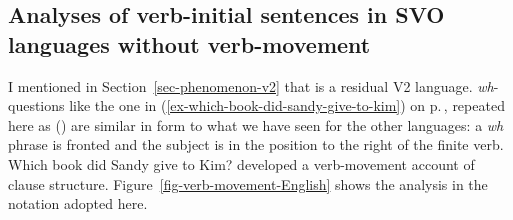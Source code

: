 


\subsection{Analyses of verb-initial sentences in SVO languages without verb-movement}
\label{sec-aux-flat}

I mentioned in Section~\ref{sec-phenomenon-v2} that  is a residual V2
language. \emph{wh}-questions like the one in (\ref{ex-which-book-did-sandy-give-to-kim}) on
p.\,\pageref{ex-which-book-did-sandy-give-to-kim}, repeated here as () are similar in form to what we
have seen for the other  languages: a \emph{wh} phrase is fronted and the subject is in the
position to the right of the finite verb.
\ea
Which book did Sandy give to Kim?
\z
\noindent
\citet{Borsley89} developed a verb-movement account of  clause
structure. Figure~\ref{fig-verb-movement-English} shows the analysis in the notation adopted here.

